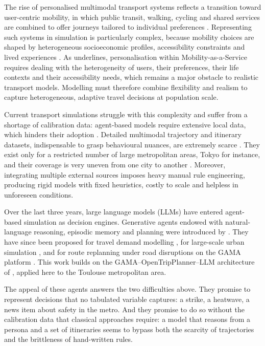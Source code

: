 The rise of personalised multimodal transport systems reflects a transition toward user-centric mobility, in which public transit, walking, cycling and shared services are combined to offer journeys tailored to individual preferences \citep{smith1995transims,horni2016matsim}. Representing such systems in simulation is particularly complex, because mobility choices are shaped by heterogeneous socioeconomic profiles, accessibility constraints and lived experiences \citep{grignard2018impact}. As \citet{oberoi2024personalisation} underlines, personalisation within Mobility-as-a-Service requires dealing with the heterogeneity of users, their preferences, their life contexts and their accessibility needs, which remains a major obstacle to realistic transport models. Modelling must therefore combine flexibility and realism to capture heterogeneous, adaptive travel decisions at population scale.

Current transport simulations struggle with this complexity and suffer from a shortage of calibration data: agent-based models require extensive local data, which hinders their adoption \citep{liu2024toward}. Detailed multimodal trajectory and itinerary datasets, indispensable to grasp behavioural nuances, are extremely scarce \citep{fourez2025transport}. They exist only for a restricted number of large metropolitan areas, Tokyo for instance, and their coverage is very uneven from one city to another \citep{feng2024agentmove}. Moreover, integrating multiple external sources imposes heavy manual rule engineering, producing rigid models with fixed heuristics, costly to scale and helpless in unforeseen conditions.

Over the last three years, large language models (LLMs) have entered agent-based simulation as decision engines. Generative agents endowed with natural-language reasoning, episodic memory and planning were introduced by \citet{park2023generative}. They have since been proposed for travel demand modelling \citep{liu2024toward}, for large-scale urban simulation \citep{bougie2025citysim}, and for route replanning under road disruptions on the GAMA platform \citep{alves2026evaluating}. This work builds on the GAMA--OpenTripPlanner--LLM architecture of \citet{vu2025modeling}, applied here to the Toulouse metropolitan area.

The appeal of these agents answers the two difficulties above. They promise to represent decisions that no tabulated variable captures: a strike, a heatwave, a news item about safety in the metro. And they promise to do so without the calibration data that classical approaches require: a model that reasons from a persona and a set of itineraries seems to bypass both the scarcity of trajectories and the brittleness of hand-written rules.

